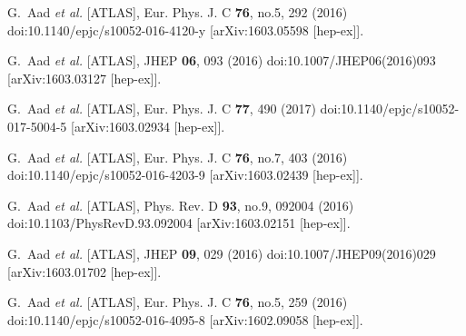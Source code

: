 \begin{thebibliography}{9}
G.~Aad \textit{et al.} [ATLAS],
Eur. Phys. J. C \textbf{76}, no.5, 292 (2016)
doi:10.1140/epjc/s10052-016-4120-y
[arXiv:1603.05598 [hep-ex]].

G.~Aad \textit{et al.} [ATLAS],
JHEP \textbf{06}, 093 (2016)
doi:10.1007/JHEP06(2016)093
[arXiv:1603.03127 [hep-ex]].

G.~Aad \textit{et al.} [ATLAS],
Eur. Phys. J. C \textbf{77}, 490 (2017)
doi:10.1140/epjc/s10052-017-5004-5
[arXiv:1603.02934 [hep-ex]].

G.~Aad \textit{et al.} [ATLAS],
Eur. Phys. J. C \textbf{76}, no.7, 403 (2016)
doi:10.1140/epjc/s10052-016-4203-9
[arXiv:1603.02439 [hep-ex]].

G.~Aad \textit{et al.} [ATLAS],
Phys. Rev. D \textbf{93}, no.9, 092004 (2016)
doi:10.1103/PhysRevD.93.092004
[arXiv:1603.02151 [hep-ex]].

G.~Aad \textit{et al.} [ATLAS],
JHEP \textbf{09}, 029 (2016)
doi:10.1007/JHEP09(2016)029
[arXiv:1603.01702 [hep-ex]].

G.~Aad \textit{et al.} [ATLAS],
Eur. Phys. J. C \textbf{76}, no.5, 259 (2016)
doi:10.1140/epjc/s10052-016-4095-8
[arXiv:1602.09058 [hep-ex]].


\end{thebibliography}
